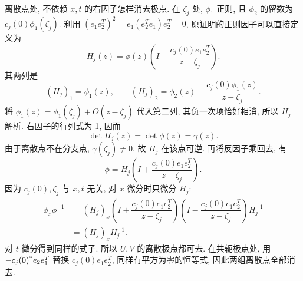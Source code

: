 \par\smallskip\noindent 离散点处, 不依赖 $x,t$ 的右因子怎样消去极点.\quad
在 $\zeta_j$ 处, $\phi_1$ 正则,
且 $\phi_2$ 的留数为 $c_j(0)\phi_1(\zeta_j)$.
利用 $(e_1e_2^T)^2=e_1(e_2^Te_1)e_2^T=0$,
原证明的正则因子可以直接定义为
\begin{equation*}
 H_j(z)
=\phi(z)\left(I-\dfrac{c_j(0)e_1e_2^T}{z-\zeta_j}\right).
\end{equation*}
其两列是
\begin{equation*}
( H_j)_1=\phi_1(z),\qquad
( H_j)_2=\phi_2(z)-\dfrac{c_j(0)\phi_1(z)}{z-\zeta_j}.
\end{equation*}
将 $\phi_1(z)=\phi_1(\zeta_j)+O(z-\zeta_j)$ 代入第二列,
其负一次项恰好相消, 所以 $ H_j$ 解析.
右因子的行列式为 1, 因而
\begin{equation*}
\det H_j(z)=\det\phi(z)=\gamma(z).
\end{equation*}
由于离散点不在分支点, $\gamma(\zeta_j)\ne0$,
故 $ H_j$ 在该点可逆.
再将反因子乘回去, 有
\begin{equation*}
\phi= H_j
\left(I+\dfrac{c_j(0)e_1e_2^T}{z-\zeta_j}\right).
\end{equation*}
因为 $c_j(0),\zeta_j$ 与 $x,t$ 无关, 对 $x$ 微分时只微分 $ H_j$:
\begin{equation*}
\begin{aligned}
\phi_x\phi^{-1}
&=( H_j)_x
\left(I+\dfrac{c_j(0)e_1e_2^T}{z-\zeta_j}\right)
\left(I-\dfrac{c_j(0)e_1e_2^T}{z-\zeta_j}\right)
 H_j^{-1}\\
&=( H_j)_x H_j^{-1}.
\end{aligned}
\end{equation*}
对 $t$ 微分得到同样的式子.
所以 $ U, V$ 的离散极点都可去.
在共轭极点处, 用 $-{c_j(0)}^{*}e_2e_1^T$ 替换
$c_j(0)e_1e_2^T$, 同样有平方为零的恒等式,
因此两组离散点全部消去.

